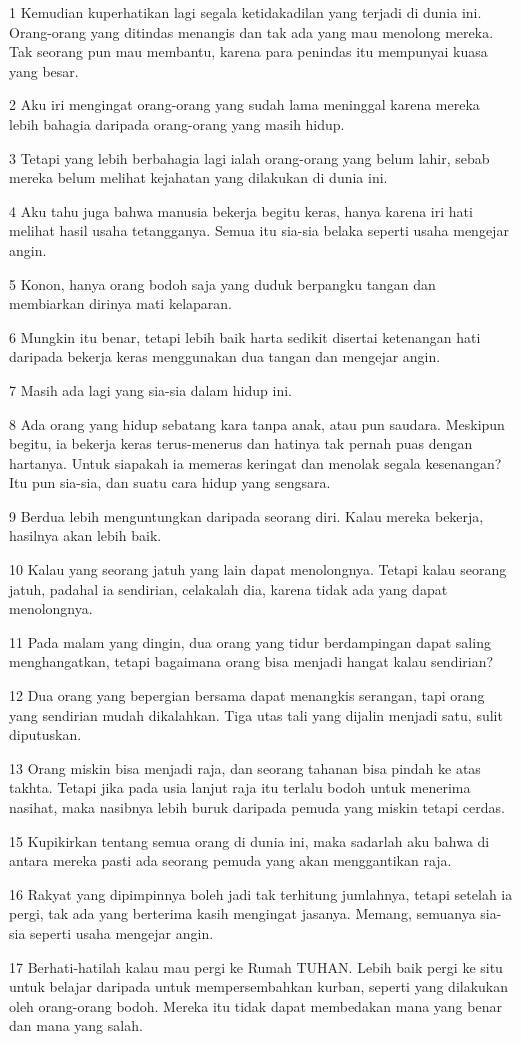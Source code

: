 \par 1 Kemudian kuperhatikan lagi segala ketidakadilan yang terjadi di dunia ini. Orang-orang yang ditindas menangis dan tak ada yang mau menolong mereka. Tak seorang pun mau membantu, karena para penindas itu mempunyai kuasa yang besar.
\par 2 Aku iri mengingat orang-orang yang sudah lama meninggal karena mereka lebih bahagia daripada orang-orang yang masih hidup.
\par 3 Tetapi yang lebih berbahagia lagi ialah orang-orang yang belum lahir, sebab mereka belum melihat kejahatan yang dilakukan di dunia ini.
\par 4 Aku tahu juga bahwa manusia bekerja begitu keras, hanya karena iri hati melihat hasil usaha tetangganya. Semua itu sia-sia belaka seperti usaha mengejar angin.
\par 5 Konon, hanya orang bodoh saja yang duduk berpangku tangan dan membiarkan dirinya mati kelaparan.
\par 6 Mungkin itu benar, tetapi lebih baik harta sedikit disertai ketenangan hati daripada bekerja keras menggunakan dua tangan dan mengejar angin.
\par 7 Masih ada lagi yang sia-sia dalam hidup ini.
\par 8 Ada orang yang hidup sebatang kara tanpa anak, atau pun saudara. Meskipun begitu, ia bekerja keras terus-menerus dan hatinya tak pernah puas dengan hartanya. Untuk siapakah ia memeras keringat dan menolak segala kesenangan? Itu pun sia-sia, dan suatu cara hidup yang sengsara.
\par 9 Berdua lebih menguntungkan daripada seorang diri. Kalau mereka bekerja, hasilnya akan lebih baik.
\par 10 Kalau yang seorang jatuh yang lain dapat menolongnya. Tetapi kalau seorang jatuh, padahal ia sendirian, celakalah dia, karena tidak ada yang dapat menolongnya.
\par 11 Pada malam yang dingin, dua orang yang tidur berdampingan dapat saling menghangatkan, tetapi bagaimana orang bisa menjadi hangat kalau sendirian?
\par 12 Dua orang yang bepergian bersama dapat menangkis serangan, tapi orang yang sendirian mudah dikalahkan. Tiga utas tali yang dijalin menjadi satu, sulit diputuskan.
\par 13 Orang miskin bisa menjadi raja, dan seorang tahanan bisa pindah ke atas takhta. Tetapi jika pada usia lanjut raja itu terlalu bodoh untuk menerima nasihat, maka nasibnya lebih buruk daripada pemuda yang miskin tetapi cerdas.
\par 15 Kupikirkan tentang semua orang di dunia ini, maka sadarlah aku bahwa di antara mereka pasti ada seorang pemuda yang akan menggantikan raja.
\par 16 Rakyat yang dipimpinnya boleh jadi tak terhitung jumlahnya, tetapi setelah ia pergi, tak ada yang berterima kasih mengingat jasanya. Memang, semuanya sia-sia seperti usaha mengejar angin.
\par 17 Berhati-hatilah kalau mau pergi ke Rumah TUHAN. Lebih baik pergi ke situ untuk belajar daripada untuk mempersembahkan kurban, seperti yang dilakukan oleh orang-orang bodoh. Mereka itu tidak dapat membedakan mana yang benar dan mana yang salah.

